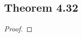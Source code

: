 \documentclass[../../main.tex]{subfiles}
\begin{document}
\subsection{Theorem 4.32}
\begin{wts}

\end{wts}
\begin{proof}

\end{proof}
\end{document}
